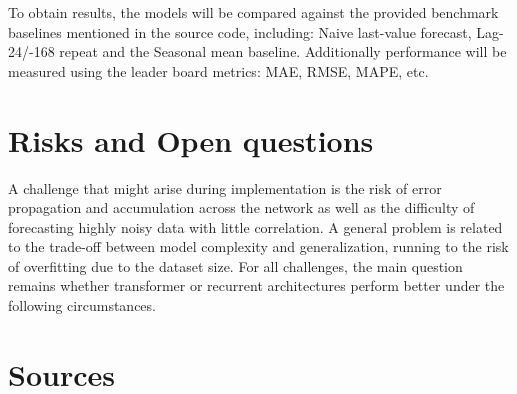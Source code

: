 \documentclass[11pt]{article}
\begin{document}
To obtain results, the models will be compared against the provided benchmark baselines mentioned in 
the source code, including: Naive last-value forecast, Lag-24/-168 repeat and the 
Seasonal mean baseline. Additionally performance will be measured using the leader board metrics:
MAE, RMSE, MAPE, etc.

\section{Risks and Open questions}
A challenge that might arise during implementation is the risk of error propagation and accumulation 
across the network as well as the difficulty of forecasting highly noisy data with little correlation.
A general problem is related to the trade-off between model complexity and generalization, running to 
the risk of overfitting due to the dataset size. For all challenges, the main question remains whether
transformer or recurrent architectures perform better under the following circumstances.

\section{Sources}
\end{document}
